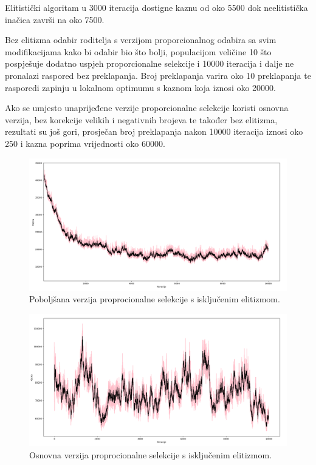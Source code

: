 \documentclass[times, utf8, zavrsni]{fer}
\begin{document}
Elitistički algoritam u 3000 iteracija dostigne kaznu od oko 5500 dok neelitistička inačica završi na oko 7500.

Bez elitizma odabir roditelja s verzijom proporcionalnog odabira sa svim modifikacijama  kako bi odabir bio što bolji, populacijom veličine 10 što pospješuje dodatno uspjeh proporcionalne selekcije i 10000 iteracija i dalje ne pronalazi raspored bez preklapanja. Broj preklapanja varira oko 10 preklapanja te rasporedi zapinju u lokalnom optimumu s kaznom koja iznosi oko 20000.

Ako se umjesto unaprijeđene verzije proporcionalne selekcije koristi osnovna verzija, bez korekcije velikih i negativnih brojeva te također bez elitizma, rezultati su još gori, prosječan broj preklapanja nakon 10000 iteracija iznosi oko 250 i kazna poprima vrijednosti oko 60000.

\begin{figure}[htb]
\centering
\includegraphics[width=14cm]{images/proporcije_e_ne.png}
\caption{Poboljšana verzija proprocionalne selekcije s isključenim elitizmom.}
\label{fig:prop_e_ne}
\end{figure}

\begin{figure}[htb]
\centering
\includegraphics[width=14cm]{images/proporcije_e_ne_gore.png}
\caption{Osnovna verzija proprocionalne selekcije s isključenim elitizmom.}
\label{fig:proporcije_e_ne_gore}
\end{figure}
\end{document}

